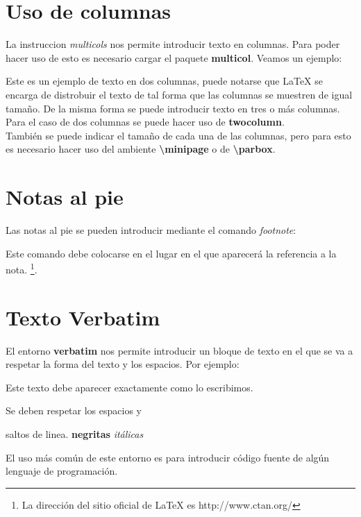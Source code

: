 \documentclass[letterpaper,12pt]{article}
\begin{document}
\section{Uso de columnas}

La instruccion \textit{multicols} nos permite introducir texto en columnas. Para poder hacer uso de esto es necesario cargar el paquete \textbf{multicol}. Veamos un ejemplo:

Este es  un ejemplo de texto en dos columnas, puede notarse que \LaTeX{} se encarga de distrobuir el texto de tal forma que las columnas se muestren de igual tamaño. De la misma forma se puede introducir texto en tres o más columnas.\\
Para el caso de dos columnas se puede hacer uso de \textbf{twocolumn}.\\
También se puede indicar el tamaño de cada una de las columnas, pero para esto es necesario hacer uso del ambiente \textbf{\textbackslash minipage} 
o de \textbf{\textbackslash parbox}.


\section{Notas al pie}

Las notas al pie se pueden introducir mediante el comando \textit{footnote}:

Este comando debe colocarse en el lugar en el que aparecerá la referencia a la nota. \footnote{La dirección del sitio oficial de \LaTeX{} es http://www.ctan.org/}.

\section{Texto Verbatim}

El entorno \textbf{verbatim} nos permite introducir un bloque de texto en el que se va a respetar la forma del texto y los espacios. Por ejemplo:

Este texto       debe aparecer   exactamente como lo escribimos.

Se deben respetar los espacios y

saltos de linea. \textbf{negritas} 
\textit{itálicas}

El uso más común de este entorno es para introducir código fuente de algún lenguaje de programación.
\end{document}
